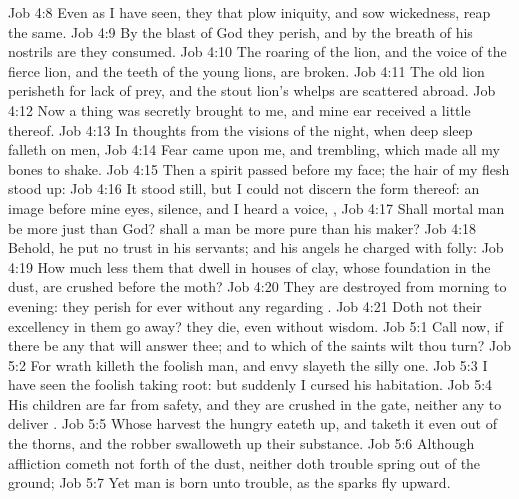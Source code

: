 \vs Job 4:8 Even as I have seen, they that plow iniquity, and sow wickedness, reap the same.
\vs Job 4:9 By the blast of God they perish, and by the breath of his nostrils are they consumed.
\vs Job 4:10 The roaring of the lion, and the voice of the fierce lion, and the teeth of the young lions, are broken.
\vs Job 4:11 The old lion perisheth for lack of prey, and the stout lion's whelps are scattered abroad.
\vs Job 4:12 Now a thing was secretly brought to me, and mine ear received a little thereof.
\vs Job 4:13 In thoughts from the visions of the night, when deep sleep falleth on men,
\vs Job 4:14 Fear came upon me, and trembling, which made all my bones to shake.
\vs Job 4:15 Then a spirit passed before my face; the hair of my flesh stood up:
\vs Job 4:16 It stood still, but I could not discern the form thereof: an image  before mine eyes,  silence, and I heard a voice, ,
\vs Job 4:17 Shall mortal man be more just than God? shall a man be more pure than his maker?
\vs Job 4:18 Behold, he put no trust in his servants; and his angels he charged with folly:
\vs Job 4:19 How much less  them that dwell in houses of clay, whose foundation  in the dust,  are crushed before the moth?
\vs Job 4:20 They are destroyed from morning to evening: they perish for ever without any regarding .
\vs Job 4:21 Doth not their excellency  in them go away? they die, even without wisdom.
\vs Job 5:1 Call now, if there be any that will answer thee; and to which of the saints wilt thou turn?
\vs Job 5:2 For wrath killeth the foolish man, and envy slayeth the silly one.
\vs Job 5:3 I have seen the foolish taking root: but suddenly I cursed his habitation.
\vs Job 5:4 His children are far from safety, and they are crushed in the gate, neither  any to deliver .
\vs Job 5:5 Whose harvest the hungry eateth up, and taketh it even out of the thorns, and the robber swalloweth up their substance.
\vs Job 5:6 Although affliction cometh not forth of the dust, neither doth trouble spring out of the ground;
\vs Job 5:7 Yet man is born unto trouble, as the sparks fly upward.
